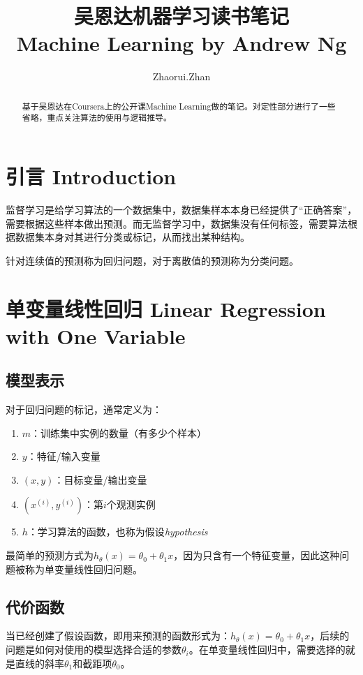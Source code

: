 \documentclass[12pt, a4paper]{article}
\title{吴恩达机器学习读书笔记 \\ Machine Learning by Andrew Ng}
\author{Zhaorui.Zhan}
\date{}
\begin{document}
    \maketitle

    \begin{abstract}    
        基于吴恩达在Coursera上的公开课Machine Learning做的笔记。对定性部分进行了一些省略，重点关注算法的使用与逻辑推导。
    \end{abstract}

    \tableofcontents
    \newpage

    \section{引言 Introduction}

        监督学习是给学习算法的一个数据集中，数据集样本本身已经提供了“正确答案”，需要根据这些样本做出预测。而无监督学习中，数据集没有任何标签，需要算法根据数据集本身对其进行分类或标记，从而找出某种结构。

        针对连续值的预测称为回归问题，对于离散值的预测称为分类问题。

    \section{单变量线性回归 Linear Regression with One Variable}

        \subsection{模型表示}
            对于回归问题的标记，通常定义为：

            \begin{enumerate}
                \item $m$：训练集中实例的数量（有多少个样本）
                \item $y$：特征/输入变量
                \item $(x, y)$：目标变量/输出变量
                \item $(x^{(i)}, y^{(i)})$：第$i$个观测实例
                \item $h$：学习算法的函数，也称为假设\textit{hypothesis}
            \end{enumerate}

            最简单的预测方式为$h_\theta(x)=\theta_0 + \theta_1x$，因为只含有一个特征变量，因此这种问题被称为单变量线性回归问题。

        \subsection{代价函数}
            当已经创建了假设函数，即用来预测的函数形式为：$h_\theta(x)=\theta_0 + \theta_1x$，后续的问题是如何对使用的模型选择合适的参数$\theta_i$。在单变量线性回归中，需要选择的就是直线的斜率$\theta_1$和截距项$\theta_0$。
\end{document}
